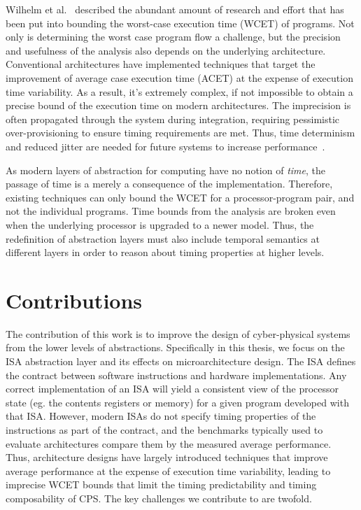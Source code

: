 Wilhelm et al.~\cite{wilhelm-survey-paper} described the abundant amount of research and effort that has been put into bounding the worst-case execution time (WCET) of programs.   
Not only is determining the worst case program flow a challenge, but the precision and usefulness of the analysis also depends on the underlying architecture\cite{Heckmann2003processor}. 
Conventional architectures have implemented techniques that target the improvement of average case execution time (ACET) at the expense of execution time variability.    
As a result, it's extremely complex, if not impossible to obtain a precise bound of the execution time on modern architectures.
The imprecision is often propagated through the system during integration, requiring pessimistic over-provisioning to ensure timing requirements are met.     
Thus, time determinism and reduced jitter are needed for future systems to increase performance~\cite{Sangiovanni-Vincentelli2007automotive}.    

As modern layers of abstraction for computing have no notion of \emph{time}, the passage of time is a merely a consequence of the implementation.  
Therefore, existing techniques can only bound the WCET for a processor-program pair, and not the individual programs.
Time bounds from the analysis are broken even when the underlying processor is upgraded to a newer model.
Thus, the redefinition of abstraction layers must also include temporal semantics at different layers in order to reason about timing properties at higher levels.  

\section{Contributions}
The contribution of this work is to improve the design of cyber-physical systems from the lower levels of abstractions. 
Specifically in this thesis, we focus on the ISA abstraction layer and its effects on microarchitecture design. 
The ISA defines the contract between software instructions and hardware implementations.
Any correct implementation of an ISA will yield a consistent view of the processor state (eg. the contents registers or memory) for a given program developed with that ISA.     
However, modern ISAs do not specify timing properties of the instructions as part of the contract, and the benchmarks typically used to evaluate architectures compare them by the measured average performance.   
Thus, architecture designs have largely introduced techniques that improve average performance at the expense of execution time variability, leading to imprecise WCET bounds that limit the timing predictability and timing composability of CPS.
The key challenges we contribute to are twofold.

